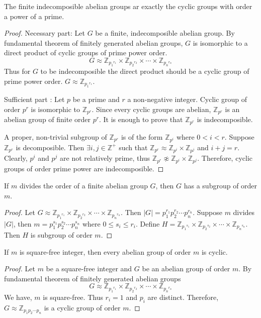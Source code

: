 \begin{theorem}
	The finite indecomposible abelian groups ar exactly the cyclic groups with order a power of a prime.
\end{theorem}
\begin{proof}
	Necessary part: 
	Let $G$ be a finite, indecomposible abelian group.
	By fundamental theorem of finitely generated abelian groups, $G$ is isomorphic to a direct product of cyclic groups of prime power order.
	\[ G \approx \mathbb{Z}_{{p_1}^{r_1}} \times \mathbb{Z}_{{p_2}^{r_2}} \times \cdots \times \mathbb{Z}_{{p_n}^{r_n}}\]
	Thus for $G$ to be indecomposible the direct product should be a cyclic group of prime power order.
	$G \approx \mathbb{Z}_{{p_1}^{r_1}}$.

	Sufficient part :
	Let $p$ be a prime and $r$ a non-negative integer.
	Cyclic group of order $p^r$ is isomorphic to $\mathbb{Z}_{p^r}$.
	Since every cyclic groups are abelian, $\mathbb{Z}_{p^r}$ is an abelian group of finite order $p^r$.
	It is enough to prove that $\mathbb{Z}_{p^r}$ is indecomposible.

	A proper, non-trivial subgroup of $\mathbb{Z}_{p^r}$ is of the form $\mathbb{Z}_{p^i}$ where $0 < i < r$.
	Suppose $\mathbb{Z}_{p^r}$ is decomposible.
	Then $\exists i,j \in \mathbb{Z}^+$ such that $\mathbb{Z}_{p^r} \approx \mathbb{Z}_{p^i} \times \mathbb{Z}_{p^j}$ and $i+j=r$.
	Clearly, $p^i$ and $p^j$ are not relatively prime, thus $\mathbb{Z}_{p^r} \not\approx \mathbb{Z}_{p^i} \times \mathbb{Z}_{p^j}$.
	Therefore, cyclic groups of order prime power are indecomposible.
\end{proof}

\begin{theorem}
	If $m$ divides the order of a finite abelian group $G$, then $G$ has a subgroup of order $m$.
\end{theorem}
\begin{proof}
	Let $G \approx \mathbb{Z}_{{p_1}^{r_1}} \times \mathbb{Z}_{{p_2}^{r_2}} \times \cdots \times \mathbb{Z}_{{p_n}^{r_n}}$.
	Then $|G| = p_1^{r_1} p_2^{r_2} \cdots p_n^{r_n}$.
	Suppose $m$ divides $|G|$, then $m = p_1^{s_1} p_2^{s_2} \cdots p_n^{s_n}$ where $0 \le s_i \le r_i$.
	Define $H = \mathbb{Z}_{{p_1}^{s_1}} \times \mathbb{Z}_{{p_2}^{s_2}} \times \cdots \times \mathbb{Z}_{{p_n}^{s_n}}$.
	Then $H$ is subgroup of order $m$.
\end{proof}

\begin{theorem}
	If $m$ is square-free integer, then every abelian group of order $m$ is cyclic.
\end{theorem}
\begin{proof}
	Let $m$ be a square-free integer and $G$ be an abelian group of order $m$.
	By fundamental theorem of finitely generated abelian groups
	\[ G \approx \mathbb{Z}_{{p_1}^{r_1}} \times \mathbb{Z}_{{p_2}^{r_2}} \times \cdots \times \mathbb{Z}_{{p_n}^{r_n}}\]
	We have, $m$ is square-free.
	Thus $r_i = 1$ and $p_i$ are distinct.
	Therefore, $G \approx \mathbb{Z}_{p_1 p_2 \cdots p_n}$ is a cyclic group of order $m$.
\end{proof}


